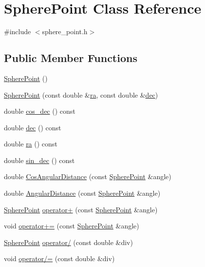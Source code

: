\hypertarget{class_sphere_point}{\section{Sphere\-Point Class Reference}
\label{class_sphere_point}
}


{\ttfamily \#include $<$sphere\-\_\-point.\-h$>$}

\subsection*{Public Member Functions}
\begin{DoxyCompactItemize}
\item 
\hyperlink{class_sphere_point_aab342d9f5d383bd1c01682180406dbe4}{Sphere\-Point} ()
\item 
\hyperlink{class_sphere_point_a4814f6bb371d345f321787ee1529d94b}{Sphere\-Point} (const double \&\hyperlink{class_sphere_point_a2c2098bee7c7771eaa6d3a5392e71aad}{ra}, const double \&\hyperlink{class_sphere_point_a680d76795d9c86ac904a91ade67c7b56}{dec})
\item 
double \hyperlink{class_sphere_point_a537fb1d152d6c3cdb1d7eb0dbe16566e}{cos\-\_\-dec} () const 
\item 
double \hyperlink{class_sphere_point_a680d76795d9c86ac904a91ade67c7b56}{dec} () const 
\item 
double \hyperlink{class_sphere_point_a2c2098bee7c7771eaa6d3a5392e71aad}{ra} () const 
\item 
double \hyperlink{class_sphere_point_ab44441b07cc0eba98514c5218000e7d4}{sin\-\_\-dec} () const 
\item 
double \hyperlink{class_sphere_point_a516f68aeeaa8df8c94e8ad7a3d84be7c}{Cos\-Angular\-Distance} (const \hyperlink{class_sphere_point}{Sphere\-Point} \&angle)
\item 
double \hyperlink{class_sphere_point_a91b2a8b3bc3b8c747146ad68dc4e2588}{Angular\-Distance} (const \hyperlink{class_sphere_point}{Sphere\-Point} \&angle)
\item 
\hyperlink{class_sphere_point}{Sphere\-Point} \hyperlink{class_sphere_point_aa7e036d410c76118134b8320aee4431e}{operator+} (const \hyperlink{class_sphere_point}{Sphere\-Point} \&angle)
\item 
void \hyperlink{class_sphere_point_aecd9b37a60a43e49a97018ec604824cd}{operator+=} (const \hyperlink{class_sphere_point}{Sphere\-Point} \&angle)
\item 
\hyperlink{class_sphere_point}{Sphere\-Point} \hyperlink{class_sphere_point_a66ff84e328e53f0c0af62c03dc59d962}{operator/} (const double \&div)
\item 
void \hyperlink{class_sphere_point_adeea8f6e508c5100397aae9f395fd52c}{operator/=} (const double \&div)
\end{DoxyCompactItemize}


